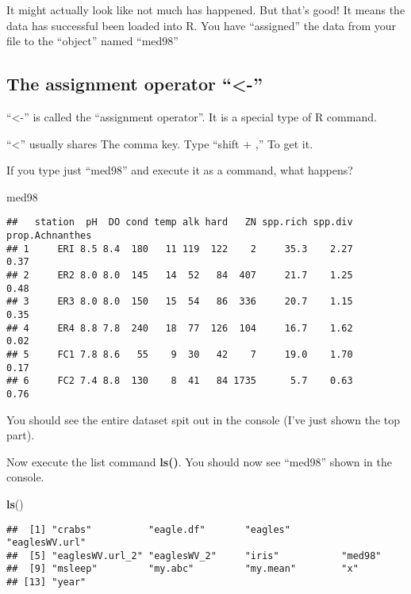 \documentclass[]{book}
\newenvironment{Shaded}{\begin{snugshade}}{\end{snugshade}}
\newcommand{\KeywordTok}[1]{\textcolor[rgb]{0.13,0.29,0.53}{\textbf{#1}}}
\newcommand{\NormalTok}[1]{#1}
\theoremstyle{definition}
\theoremstyle{definition}
\theoremstyle{definition}
\theoremstyle{remark}
\begin{document}
It might actually look like not much has happened. But that's good! It
means the data has successful been loaded into R. You have ``assigned''
the data from your file to the ``object'' named ``med98''

\subsection{\texorpdfstring{The assignment operator
``\textless{}-''}{The assignment operator \textless{}-}}\label{the-assignment-operator--}

``\textless{}-'' is called the ``assignment operator''. It is a special
type of R command.

``\textless{}'' usually shares The comma key. Type ``shift + ,'' To get
it.

If you type just ``med98'' and execute it as a command, what happens?

\begin{Shaded}
\begin{Highlighting}[]
\NormalTok{med98}
\end{Highlighting}
\end{Shaded}

\begin{verbatim}
##   station  pH  DO cond temp alk hard   ZN spp.rich spp.div prop.Achnanthes
## 1     ERI 8.5 8.4  180   11 119  122    2     35.3    2.27            0.37
## 2     ER2 8.0 8.0  145   14  52   84  407     21.7    1.25            0.48
## 3     ER3 8.0 8.0  150   15  54   86  336     20.7    1.15            0.35
## 4     ER4 8.8 7.8  240   18  77  126  104     16.7    1.62            0.02
## 5     FC1 7.8 8.6   55    9  30   42    7     19.0    1.70            0.17
## 6     FC2 7.4 8.8  130    8  41   84 1735      5.7    0.63            0.76
\end{verbatim}

You should see the entire dataset spit out in the console (I've just
shown the top part).

Now execute the list command \textbf{ls()}. You should now see ``med98''
shown in the console.

\begin{Shaded}
\begin{Highlighting}[]
\KeywordTok{ls}\NormalTok{()}
\end{Highlighting}
\end{Shaded}

\begin{verbatim}
##  [1] "crabs"          "eagle.df"       "eagles"         "eaglesWV.url"  
##  [5] "eaglesWV.url_2" "eaglesWV_2"     "iris"           "med98"         
##  [9] "msleep"         "my.abc"         "my.mean"        "x"             
## [13] "year"
\end{verbatim}
\end{document}
